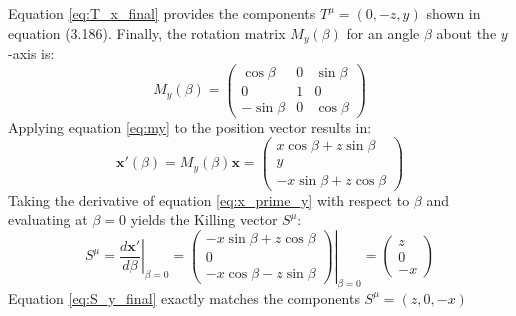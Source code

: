 \documentclass[11pt, a4paper]{report}
\begin{document}
Equation \eqref{eq:T_x_final} provides the components $T^\mu = (0, -z, y)$ shown in equation (3.186).
Finally, the rotation matrix $M_y(\beta)$ for an angle $\beta$ about the $y$-axis is:
\begin{equation} M_y(\beta) = \begin{pmatrix} \cos\beta & 0 & \sin\beta \\ 0 & 1 & 0 \\ -\sin\beta & 0 & \cos\beta \end{pmatrix} \label{eq:my} \end{equation}
Applying equation \eqref{eq:my} to the position vector results in:
\begin{equation} \mathbf{x}'(\beta) = M_y(\beta) \mathbf{x} = \begin{pmatrix} x\cos\beta + z\sin\beta \\ y \\ -x\sin\beta + z\cos\beta \end{pmatrix} \label{eq:x_prime_y} \end{equation}
Taking the derivative of equation \eqref{eq:x_prime_y} with respect to $\beta$ and evaluating at $\beta = 0$ yields the Killing vector $S^\mu$:
\begin{equation} S^\mu = \left. \frac{d\mathbf{x}'}{d\beta} \right|_{\beta=0} = \left. \begin{pmatrix} -x\sin\beta + z\cos\beta \\ 0 \\ -x\cos\beta - z\sin\beta \end{pmatrix} \right|_{\beta=0} = \begin{pmatrix} z \\ 0 \\ -x \end{pmatrix} \label{eq:S_y_final} \end{equation}
Equation \eqref{eq:S_y_final} exactly matches the components $S^\mu = (z, 0, -x)$ 
\end{document}
